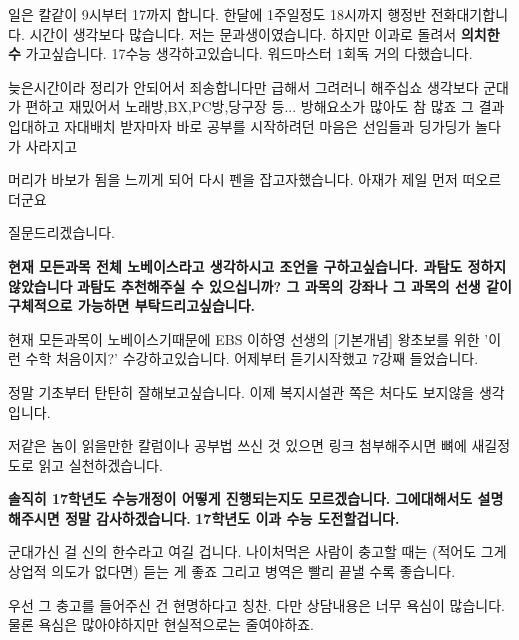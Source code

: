     일은 칼같이 9시부터 17까지 합니다. 한달에 1주일정도 18시까지 행정반 전화대기합니다. 시간이 생각보다 많습니다.
    저는 문과생이였습니다. 하지만 이과로 돌려서 \textbf{의치한수} 가고싶습니다.
    17수능 생각하고있습니다. 워드마스터 1회독 거의 다했습니다.
    \vspace{5mm}

    늦은시간이라 정리가 안되어서 죄송합니다만 급해서 그려러니 해주십쇼
    생각보다 군대가 편하고 재밌어서 노래방,BX,PC방,당구장 등... 방해요소가 많아도 참 많죠
    그 결과 입대하고 자대배치 받자마자 바로 공부를 시작하려던 마음은 선임들과 딩가딩가 놀다가 사라지고
    \vspace{5mm}

    머리가 바보가 됨을 느끼게 되어
    다시 펜을 잡고자했습니다. 아재가 제일 먼저 떠오르더군요
    \vspace{5mm}

    질문드리겠습니다.
    \vspace{5mm}

    \textbf{현재 모든과목 전체 노베이스라고 생각하시고 조언을 구하고싶습니다. 과탐도 정하지 않았습니다}
    \textbf{과탐도 추천해주실 수 있으십니까? 그 과목의 강좌나 그 과목의 선생 같이 구체적으로 가능하면 부탁드리고싶습니다.}
    \vspace{5mm}

    현재 모든과목이 노베이스기때문에 EBS 이하영 선생의 [기본개념] 왕초보를 위한 '이런 수학 처음이지?' 수강하고있습니다.
    어제부터 듣기시작했고 7강째 들었습니다.
    \vspace{5mm}

    정말 기초부터 탄탄히 잘해보고싶습니다. 이제 복지시설관 쪽은 처다도 보지않을 생각입니다.
    \vspace{5mm}

    저같은 놈이 읽을만한 칼럼이나 공부법 쓰신 것 있으면 링크 첨부해주시면 뼈에 새길정도로 읽고 실천하겠습니다.
    \vspace{5mm}

    \textbf{솔직히 17학년도 수능개정이 어떻게 진행되는지도 모르겠습니다.}
    \textbf{그에대해서도 설명해주시면 정말 감사하겠습니다.}
    \textbf{17학년도 이과 수능 도전할겁니다.}
    \vspace{5mm}


군대가신 걸 신의 한수라고 여길 겁니다. 나이처먹은 사람이 충고할 때는 (적어도 그게 상업적 의도가 없다면) 듣는 게 좋죠
그리고 병역은 빨리 끝낼 수록 좋습니다.
\vspace{5mm}

우선 그 충고를 들어주신 건 현명하다고 칭찬.
다만 상담내용은 너무 욕심이 많습니다. 물론 욕심은 많아야하지만 현실적으로는 줄여야하죠.
\vspace{5mm}

